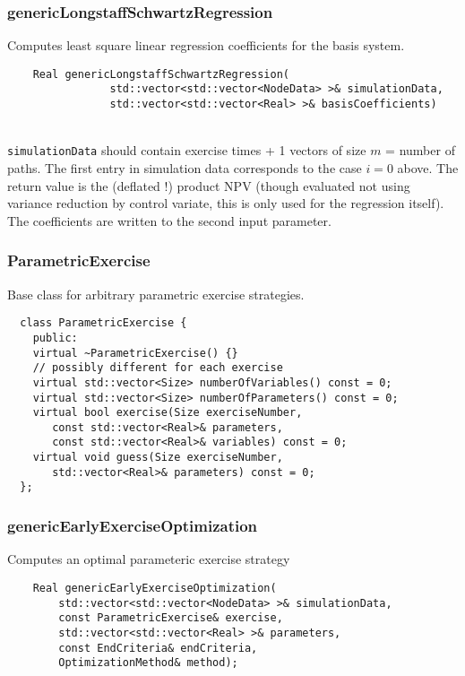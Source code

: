 \documentclass{beamer}
\begin{document}
\begin{frame}[fragile]
\frametitle{genericLongstaffSchwartzRegression}
Computes least square linear regression coefficients for the basis system.
\vspace{\baselineskip} \\
\begin{verbatim}
    Real genericLongstaffSchwartzRegression(
                std::vector<std::vector<NodeData> >& simulationData,
                std::vector<std::vector<Real> >& basisCoefficients)
\end{verbatim}
\vspace{\baselineskip} \\
\verb+simulationData+ should contain exercise times + 1 vectors of size $m$ = number of paths.
The first entry in simulation data corresponds to the case $i=0$ above.
The return value is the (deflated !) product NPV (though evaluated not using variance reduction
by control variate, this is only used for the regression itself). The coefficients are written to
the second input parameter.
\end{frame}


\begin{frame}[fragile]
\frametitle{ParametricExercise}
Base class for arbitrary parametric exercise strategies.
\vspace{\baselineskip} \\
\begin{verbatim}
  class ParametricExercise {
    public:
    virtual ~ParametricExercise() {}
    // possibly different for each exercise
    virtual std::vector<Size> numberOfVariables() const = 0;
    virtual std::vector<Size> numberOfParameters() const = 0;
    virtual bool exercise(Size exerciseNumber,
       const std::vector<Real>& parameters,
       const std::vector<Real>& variables) const = 0;
    virtual void guess(Size exerciseNumber,
       std::vector<Real>& parameters) const = 0;
  };
\end{verbatim}
\end{frame}

\begin{frame}[fragile]
\frametitle{genericEarlyExerciseOptimization}
Computes an optimal parameteric exercise strategy
\vspace{\baselineskip}
\begin{verbatim}
    Real genericEarlyExerciseOptimization(
        std::vector<std::vector<NodeData> >& simulationData,
        const ParametricExercise& exercise,
        std::vector<std::vector<Real> >& parameters,
        const EndCriteria& endCriteria,
        OptimizationMethod& method);
\end{verbatim}
\end{frame}
\end{document}
